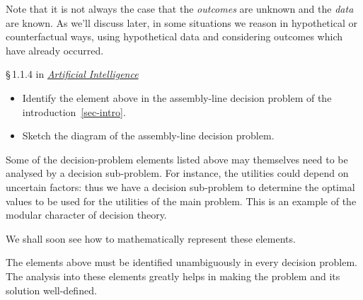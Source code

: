 \documentclass[
  a4paper,
  DIV=11,
  numbers=noendperiod,
  oneside]{scrreprt}
\providecommand{\tightlist}{%
  \setlength{\itemsep}{0pt}\setlength{\parskip}{0pt}}\usepackage{longtable,booktabs,array}
\begin{document}
Note that it is not always the case that the \emph{outcomes} are unknown
and the \emph{data} are known. As we'll discuss later, in some
situations we reason in hypothetical or counterfactual ways, using
hypothetical data and considering outcomes which have already occurred.

\begin{tcolorbox}[enhanced jigsaw, opacitybacktitle=0.6, bottomrule=.15mm, opacityback=0, toprule=.15mm, breakable, colframe=quarto-callout-caution-color-frame, titlerule=0mm, toptitle=1mm, rightrule=.15mm, leftrule=.75mm, bottomtitle=1mm, coltitle=black, colbacktitle=quarto-callout-caution-color!10!white, title={\faIcon{book-open} Reading}, arc=.35mm, left=2mm, colback=white]

§\,1.1.4 in
\href{https://hvl.instructure.com/courses/25074/modules/items/660089}{\emph{Artificial
Intelligence}}

\end{tcolorbox}

\begin{tcolorbox}[enhanced jigsaw, opacitybacktitle=0.6, bottomrule=.15mm, opacityback=0, toprule=.15mm, breakable, colframe=quarto-callout-caution-color-frame, titlerule=0mm, toptitle=1mm, rightrule=.15mm, leftrule=.75mm, bottomtitle=1mm, coltitle=black, colbacktitle=quarto-callout-caution-color!10!white, title={\faIcon{pen} Exercise}, arc=.35mm, left=2mm, colback=white]

\begin{itemize}
\tightlist
\item
  Identify the element above in the assembly-line decision problem of
  the introduction~\ref{sec-intro}.
\item
  Sketch the diagram of the assembly-line decision problem.
\end{itemize}

\end{tcolorbox}

Some of the decision-problem elements listed above may themselves need
to be analysed by a decision sub-problem. For instance, the utilities
could depend on uncertain factors: thus we have a decision sub-problem
to determine the optimal values to be used for the utilities of the main
problem. This is an example of the modular character of decision theory.

We shall soon see how to mathematically represent these elements.

The elements above must be identified unambiguously in every decision
problem. The analysis into these elements greatly helps in making the
problem and its solution well-defined.
\end{document}
